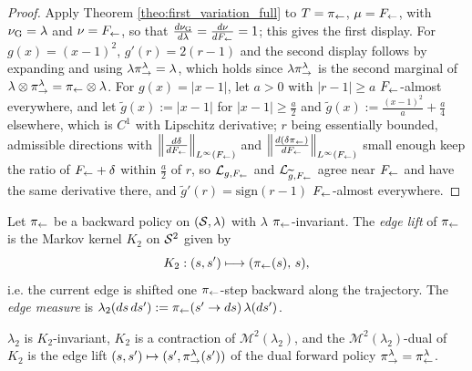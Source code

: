 \begin{proof}
Apply Theorem \ref{theo:first_variation_full} to $T=\pi_{\leftarrow}$, $\mu=F_{\leftarrow}$, with $\nu_{\mathrm{G}}=\lambda$ and $\nu=F_{\leftarrow}$, so that $\frac{d\nu_{\mathrm{G}}}{d\lambda}=\frac{d\nu}{dF_{\leftarrow}}=1$; this gives the first display. For $g(x)=(x-1)^2$, $g'(r)=2(r-1)$ and the second display follows by expanding and using $\lambda\pi_{\rightarrow}^\lambda=\lambda$, which holds since $\lambda\pi_{\rightarrow}^\lambda$ is the second marginal of $\lambda \otimes \pi_{\rightarrow}^\lambda = \pi_{\leftarrow}\otimes\lambda$. For $g(x)=|x-1|$, let $a>0$ with $|r-1|\geq a$ $F_{\leftarrow}$-almost everywhere, and let $\widetilde g(x):=|x-1|$ for $|x-1|\geq\frac a2$ and $\widetilde g(x):=\frac{(x-1)^2}a+\frac a4$ elsewhere, which is $C^1$ with Lipschitz derivative; $r$ being essentially bounded, admissible directions with $\left\|\frac{d\delta}{dF_{\leftarrow}}\right\|_{L^\infty(F_{\leftarrow})}$ and $\left\|\frac{d(\delta\pi_{\leftarrow})}{dF_{\leftarrow}}\right\|_{L^\infty(F_{\leftarrow})}$ small enough keep the ratio of $F_{\leftarrow}+\delta$ within $\frac a2$ of $r$, so $\mathcal L_{g,F_{\leftarrow}}$ and $\mathcal L_{\widetilde g,F_{\leftarrow}}$ agree near $F_{\leftarrow}$ and have the same derivative there, and $\widetilde g'(r)=\mathrm{sign}(r-1)$ $F_{\leftarrow}$-almost everywhere.
\end{proof}

\begin{definition}\label{def:edge_lift}
Let $\pi_{\leftarrow}$ be a backward policy on $(\mathcal S,\lambda)$ with $\lambda$ $\pi_{\leftarrow}$-invariant. The \emph{edge lift} of $\pi_{\leftarrow}$ is the Markov kernel $K_2$ on $\mathcal S^2$ given by
\begin{equation}
    K_2 : (s,s') \longmapsto (\pi_{\leftarrow}(s),\, s),
\end{equation}
i.e. the current edge is shifted one $\pi_{\leftarrow}$-step backward along the trajectory. The \emph{edge measure} is $\lambda_2(ds\,ds') := \pi_{\leftarrow}(s'\rightarrow ds)\,\lambda(ds')$.
\end{definition}

\begin{lemma}\label{lem:lift_wellposed}
$\lambda_2$ is $K_2$-invariant, $K_2$ is a contraction of $\mathcal M^2(\lambda_2)$, and the $\mathcal M^2(\lambda_2)$-dual of $K_2$ is the edge lift $(s,s')\mapsto (s', \pi_{\rightarrow}^\lambda(s'))$ of the dual forward policy $\pi_{\rightarrow}^\lambda = \pi_{\leftarrow}^\lambda$.
\end{lemma}


